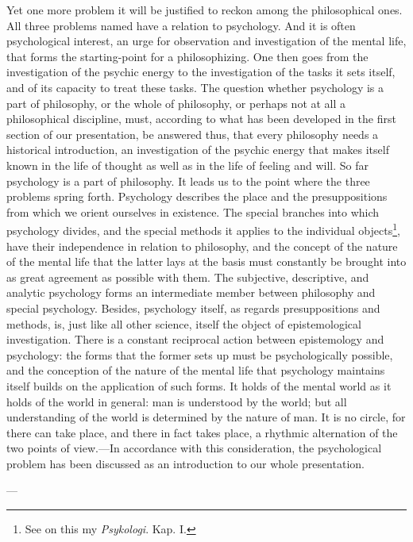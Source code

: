 \documentclass[12pt,a4paper]{book}
\newcommand{\opage}[1]{\marginnote{\footnotesize\textit{[#1]}}}
\begin{document}
Yet one more problem it will be justified to reckon among the philosophical
ones. All three problems named have a relation to psychology. And it is often
psychological interest, an urge for observation and investigation of the
mental life, that forms the starting-point for a philosophizing. One then goes
from the investigation of the psychic energy to the investigation of the tasks
it sets itself, and of its capacity to treat these tasks. The question whether
psychology is a part of philosophy, or the whole of philosophy, or perhaps not
at all a philosophical discipline, must, according to what has been developed
in the first section of our presentation, be answered thus, that every
philosophy needs a historical introduction, an investigation of the psychic
energy that makes itself known in the life of thought as well as in the life
of feeling and will. So far psychology is a part of philosophy. It leads us to
the point where the three problems spring forth. Psychology describes the
place and the presuppositions from which we orient ourselves in existence. The
special branches into which psychology divides, and the special methods it
applies to the individual objects\footnote{See on this my \emph{Psykologi}.
Kap. I.}, have their independence in relation to philosophy, and the concept
of the nature of the mental life that the latter lays at the basis must
constantly be brought into as great agreement as possible with them. The
subjective, descriptive, and analytic psychology forms an intermediate member
between philosophy and special psychology. Besides, psychology itself, as
regards presuppositions and methods, is, just like all other \opage{254}science, itself
the object of epistemological investigation. There is a constant reciprocal
action between epistemology and psychology: the forms that the former sets up
must be psychologically possible, and the conception of the nature of the
mental life that psychology maintains itself builds on the application of such
forms. It holds of the mental world as it holds of the world in general: man
is understood by the world; but all understanding of the world is determined
by the nature of man. It is no circle, for there can take place, and there in
fact takes place, a rhythmic alternation of the two points of view.---In
accordance with this consideration, the psychological problem has been
discussed as an introduction to our whole presentation.

\begin{center}---\end{center}
\end{document}
